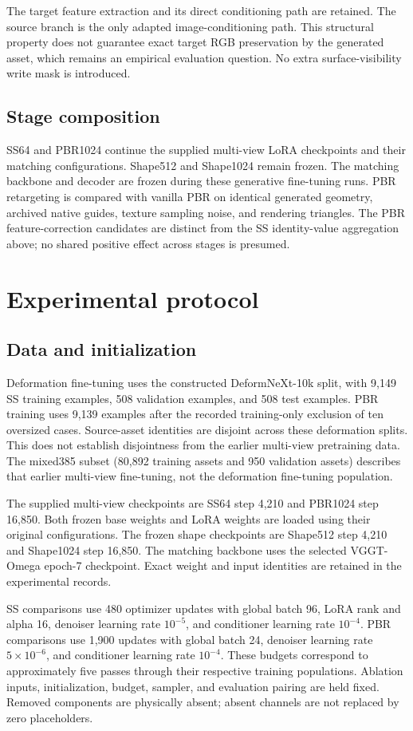 \documentclass[10pt]{article}
\begin{document}
The target feature extraction and its direct conditioning path are retained.
The source branch is the only adapted image-conditioning path. This structural
property does not guarantee exact target RGB preservation by the generated
asset, which remains an empirical evaluation question. No extra
surface-visibility write mask is introduced.

\subsection{Stage composition}
SS64 and PBR1024 continue the supplied multi-view LoRA checkpoints and their
matching configurations. Shape512 and Shape1024 remain frozen. The matching
backbone and decoder are frozen during these generative fine-tuning runs.
PBR retargeting is compared with vanilla PBR on identical generated geometry,
archived native guides, texture sampling noise, and rendering triangles.
The PBR feature-correction candidates are distinct from the SS identity-value
aggregation above; no shared positive effect across stages is presumed.

\section{Experimental protocol}
\subsection{Data and initialization}
Deformation fine-tuning uses the constructed DeformNeXt-10k split, with 9,149
SS training examples, 508 validation examples, and 508 test examples. PBR
training uses 9,139 examples after the recorded training-only exclusion of ten
oversized cases. Source-asset identities are disjoint across these deformation
splits. This does not establish disjointness from the earlier multi-view
pretraining data. The mixed385 subset (80,892 training assets and 950 validation
assets) describes that earlier multi-view fine-tuning, not the deformation
fine-tuning population.

The supplied multi-view checkpoints are SS64 step 4,210 and PBR1024 step
16,850. Both frozen base weights and LoRA weights are loaded using their
original configurations. The frozen shape checkpoints are Shape512 step
4,210 and Shape1024 step 16,850. The matching backbone uses the selected
VGGT-Omega epoch-7 checkpoint. Exact weight and input identities are retained
in the experimental records.

SS comparisons use 480 optimizer updates with global batch 96, LoRA rank and
alpha 16, denoiser learning rate $10^{-5}$, and conditioner learning rate
$10^{-4}$. PBR comparisons use 1,900 updates with global batch 24, denoiser
learning rate $5\times10^{-6}$, and conditioner learning rate $10^{-4}$.
These budgets correspond to approximately five passes through their respective
training populations. Ablation inputs, initialization, budget, sampler, and
evaluation pairing are held fixed. Removed components are physically absent;
absent channels are not replaced by zero placeholders.
\end{document}
